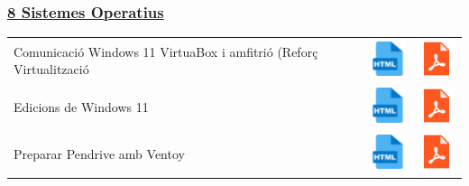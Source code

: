 \documentclass[
  12 pt,
  a4paper,
]{article}
\begin{document}
\subsubsection{\texorpdfstring{\hyperref[U7]{8 Sistemes
Operatius}}{8 Sistemes Operatius}}\label{sistemes-operatius}

\begin{longtable}[]{@{}
  >{\raggedright\arraybackslash}p{}
  >{\raggedright\arraybackslash}p{}
  >{\raggedright\arraybackslash}p{}@{}}
\toprule\noalign{}
\endhead
\bottomrule\noalign{}
\endlastfoot
Comunicació Windows 11 VirtuaBox i amfitrió (Reforç Virtualització &
\href{U8-SISTEMA\%20PROPIETARI-WINDOWS\%2011/U8-Virtualització-Windows11.html}{\includegraphics{recursos/iconohtml.png}}
&
\href{U8-SISTEMA\%20PROPIETARI-WINDOWS\%2011/U8-Virtualització-Windows11.pdf}{\includegraphics{recursos/iconopdf.png}} \\
Edicions de Windows 11 &
\href{U8-SISTEMA\%20PROPIETARI-WINDOWS\%2011/U8-DistrosWindows11.html}{\includegraphics{recursos/iconohtml.png}}
&
\href{U8-SISTEMA\%20PROPIETARI-WINDOWS\%2011/U8-DistrosWindows11.pdf}{\includegraphics{recursos/iconopdf.png}} \\
Preparar Pendrive amb Ventoy &
\href{U8-SISTEMA\%20PROPIETARI-WINDOWS\%2011/U8-PrepararPendriveVentoy.html}{\includegraphics{recursos/iconohtml.png}}
&
\href{U8-SISTEMA\%20PROPIETARI-WINDOWS\%2011/U8-PrepararPendriveVentoy.pdf}{\includegraphics{recursos/iconopdf.png}} \\

\end{longtable}
\end{document}
